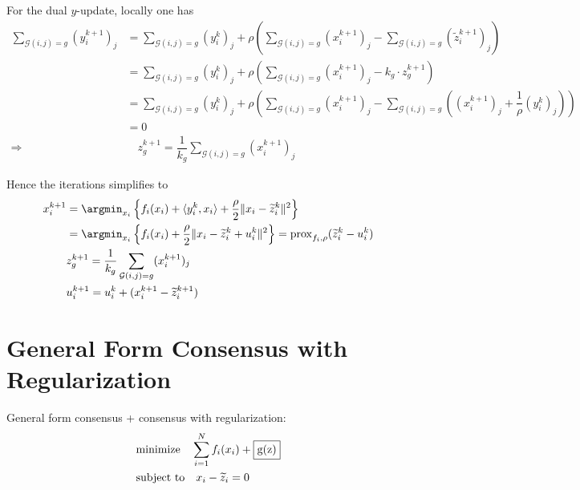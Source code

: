 For the dual $y$-update, locally one has
\begin{align*}
    \sum\limits_{\mathcal{G}(i,j)=g} (y_i^{k+1})_j & = \sum\limits_{\mathcal{G}(i,j)=g} (y_i^k)_j + \rho \left( \sum\limits_{\mathcal{G}(i,j)=g} (x_i^{k+1})_j - \sum\limits_{\mathcal{G}(i,j)=g} (\widetilde{z}_i^{k+1})_j \right) \\
    & = \sum\limits_{\mathcal{G}(i,j)=g} (y_i^k)_j + \rho \left( \sum\limits_{\mathcal{G}(i,j)=g} (x_i^{k+1})_j - k_g\cdot z_g^{k+1} \right) \\
    & = \sum\limits_{\mathcal{G}(i,j)=g} (y_i^k)_j + \rho \left( \sum\limits_{\mathcal{G}(i,j)=g} (x_i^{k+1})_j - \sum\limits_{\mathcal{G}(i,j)=g} \left( (x_i^{k+1})_j + \dfrac{1}{\rho} (y_i^k)_j \right) \right) \\
    & = 0 \\
    \Rightarrow & \quad z_g^{k+1} = \dfrac{1}{k_g} \sum\limits_{\mathcal{G}(i,j)=g} (x_i^{k+1})_j
\end{align*}

Hence the iterations simplifies to
\begin{align*}
    x_i^{k+1} & = \argmin_{x_i} \left\{ f_i(x_i) + \langle y_i^k,x_i \rangle + \dfrac{\rho}{2} \lVert x_i-\widetilde{z}_i^k \rVert^2 \right\} \\
    & = \argmin_{x_i} \left\{ f_i(x_i) + \dfrac{\rho}{2} \lVert x_i - \widetilde{z}_i^k + u_i^k \rVert^2 \right\} = \operatorname{prox}_{f_i,\rho} (\widetilde{z}_i^k - u_i^k) \\
    & z_g^{k+1} = \dfrac{1}{k_g} \sum\limits_{\mathcal{G}(i,j)=g} (x_i^{k+1})_j \\
    & u_i^{k+1} = u_i^k + (x_i^{k+1} - \widetilde{z}^{k+1}_i)
\end{align*}

\section{General Form Consensus with Regularization}
General form consensus + consensus with regularization:
\begin{align*}
    & \text{minimize} \quad \sum\limits_{i=1}^N f_i(x_i) + \framebox{g(z)} \\
    & \text{subject to} \quad x_i - \widetilde{z}_i = 0
\end{align*}


